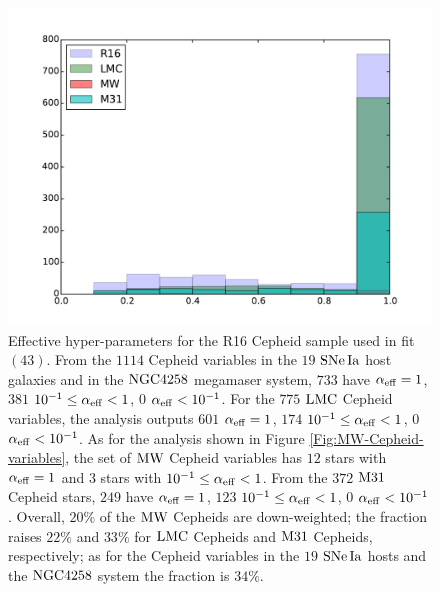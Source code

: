 \begin{figure}[hbtp]
\centering
\includegraphics[width=\textwidth]{figures/chapter-h0/effective_HP_histogram_R16.pdf}
\caption{Effective hyper-parameters for the R16 Cepheid sample used in fit $(43)$. From the $1114$ Cepheid variables in the $19$ $\mathrm{SNe\,Ia}$ host galaxies and in the $\mathrm{NGC4258}$ megamaser system, $733$ have $\alpha_{\mathrm{eff}}=1$, $381$ $10^{-1}\leq \alpha_{\mathrm{eff}} < 1$, $0$   $\alpha_{\mathrm{eff}} < 10^{-1}$. For the $775$ $\mathrm{LMC}$ Cepheid variables, the analysis outputs $601$  $\alpha_{\mathrm{eff}}=1$, $174$ $10^{-1}\leq \alpha_{\mathrm{eff}} < 1$, $0$  $\alpha_{\mathrm{eff}} < 10^{-1}$. As for the analysis shown in Figure \ref{Fig:MW-Cepheid-variables}, the set of $\mathrm{MW}$ Cepheid variables has $12$ stars with $\alpha_{\mathrm{eff}}=1$ and $3$ stars with $10^{-1}\leq \alpha_{\mathrm{eff}} < 1$. From the $372$ $\mathrm{M31}$ Cepheid stars, $249$ have $\alpha_{\mathrm{eff}}=1$, $123$ $10^{-1}\leq \alpha_{\mathrm{eff}} < 1$, $0$   $\alpha_{\mathrm{eff}} < 10^{-1}$. Overall, $20\%$ of the $\mathrm{MW}$ Cepheids are down-weighted; the fraction raises $22\%$ and $33\%$  for $\mathrm{LMC}$ Cepheids and $\mathrm{M31}$ Cepheids, respectively; as for the Cepheid variables in the $19$ $\mathrm{SNe\,Ia}$ hosts and the $\mathrm{NGC4258}$ system the fraction is $34\%$.}
\label{Fig:effective-HP-fit-43}
\end{figure}

